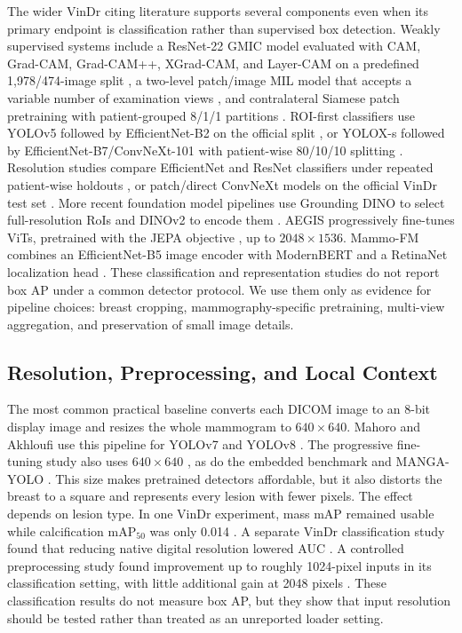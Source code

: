 The wider VinDr citing literature supports several components even when its
primary endpoint is classification rather than supervised box detection.
Weakly supervised systems include a ResNet-22 GMIC model evaluated with CAM,
Grad-CAM, Grad-CAM++, XGrad-CAM, and Layer-CAM on a predefined 1,978/474-image
split \cite{sampaio2023weak}, a two-level patch/image MIL model that accepts a
variable number of examination views \cite{pathak2023caselevel}, and
contralateral Siamese patch pretraining with patient-grouped 8/1/1 partitions
\cite{vanvorst2024siamese}. ROI-first classifiers use YOLOv5 followed by
EfficientNet-B2 on the official split \cite{tran2023transparency}, or YOLOX-s
followed by EfficientNet-B7/ConvNeXt-101 with patient-wise 80/10/10 splitting
\cite{huynh2023roi}. Resolution studies compare EfficientNet and ResNet
classifiers under repeated patient-wise holdouts
\cite{ferreira2026preprocessing}, or patch/direct ConvNeXt models on the
official VinDr test set \cite{petrini2025resolution}. More recent foundation
model pipelines use Grounding DINO \cite{liu2024groundingdino} to select
full-resolution RoIs and DINOv2 \cite{oquab2024dinov2} to encode them
\cite{sanghvi2026attend}. AEGIS \cite{waggener2026aegis} progressively
fine-tunes ViTs, pretrained with the JEPA objective \cite{assran2023ijepa}, up
to $2048\!\times\!1536$. Mammo-FM combines an
EfficientNet-B5 image encoder with ModernBERT and a RetinaNet localization head
\cite{ghosh2025mammofm}. These classification and representation studies do not
report box AP under a common detector protocol. We use them only as evidence
for pipeline choices: breast cropping, mammography-specific pretraining,
multi-view aggregation, and preservation of small image details.

\subsection{Resolution, Preprocessing, and Local Context}
\label{sec:background_resolution}

The most common practical baseline converts each DICOM image to an 8-bit display
image and resizes the whole mammogram to $640\!\times\!640$. Mahoro and Akhloufi
use this pipeline for YOLOv7 and YOLOv8 \cite{mahoro2023oneshot}. The progressive
fine-tuning study also uses $640\!\times\!640$ \cite{figueiredo2026progressive},
as do the embedded benchmark \cite{intasam2025embedded} and MANGA-YOLO
\cite{trang2025manga}. This size makes pretrained detectors affordable, but it
also distorts the breast to a square and represents every lesion with fewer
pixels. The effect depends on lesion type. In one VinDr experiment, mass mAP
remained usable while calcification mAP$_{50}$ was only 0.014
\cite{abdikenov2025transfer}. A separate VinDr classification study found that
reducing native digital resolution lowered AUC \cite{petrini2025resolution}. A
controlled preprocessing study found improvement up to roughly 1024-pixel
inputs in its classification setting, with little additional gain at 2048
pixels \cite{ferreira2026preprocessing}. These classification results do not
measure box AP, but they show that input resolution should be tested rather
than treated as an unreported loader setting.

